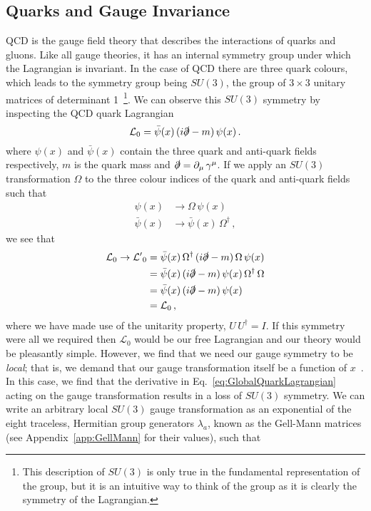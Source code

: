 \subsection{Quarks and Gauge Invariance}
QCD is the gauge field theory that describes the interactions of quarks and gluons. Like all gauge theories, it has an internal symmetry group under which the Lagrangian is invariant. In the case of QCD there are three quark colours, which leads to the symmetry group being $SU(3)$, the group of $3\times 3$ unitary matrices of determinant 1~\footnote{This description of $SU(3)$ is only true in the fundamental representation of the group, but it is an intuitive way to think of the group as it is clearly the symmetry of the Lagrangian.}. We can observe this $SU(3)$ symmetry by inspecting the QCD quark Lagrangian
%
\begin{equation}
\mathcal{L}_0 = \bar{\psi}(x)\,(i\slashed{\partial}-m)\,\psi(x)\,.
\label{eq:GlobalQuarkLagrangian}
\end{equation}
%
where $\psi(x)$ and $\bar{\psi}(x)$ contain the three quark and anti-quark fields respectively, $m$ is the quark mass and $\slashed{\partial}=\partial_\mu\,\gamma^\mu$. If we apply an $SU(3)$ transformation $\Omega$ to the three colour indices of the quark and anti-quark fields such that
%
\begin{align*}
\psi(x)&\rightarrow\Omega\,\psi(x)\\
\bar{\psi}(x)&\rightarrow \bar{\psi}(x)\,\Omega^\dagger\, ,
\end{align*}
%
we see that
%
\begin{align*}
\mathcal{L}_0\rightarrow\mathcal{L'}_0&=\bar{\psi}(x)\,\Omega^\dag\,(i\slashed{\partial}-m)\,\Omega\,\psi(x)\\
&= \bar{\psi}(x)\,(i\slashed{\partial}-m)\,\psi(x)\,\Omega^\dag\,\Omega\\
&= \bar{\psi}(x)\,(i\slashed{\partial}-m)\,\psi(x)\\
&= \mathcal{L}_0\, ,
\end{align*}
%
where we have made use of the unitarity property, $U\,U^\dag = I$. If this symmetry were all we required then $\mathcal{L}_0$ would be our free Lagrangian and our theory would be pleasantly simple. However, we find that we need our gauge symmetry to be \textit{local}; that is, we demand that our gauge transformation itself be a function of $x$~\cite{peskin2018introduction}. In this case, we find that the derivative in Eq.~\ref{eq:GlobalQuarkLagrangian} acting on the gauge transformation results in a loss of $SU(3)$ symmetry. We can write an arbitrary local $SU(3)$ gauge transformation as an exponential of the eight traceless, Hermitian group generators $\lambda_a$, known as the Gell-Mann matrices (see Appendix~\ref{app:GellMann} for their values), such that 
